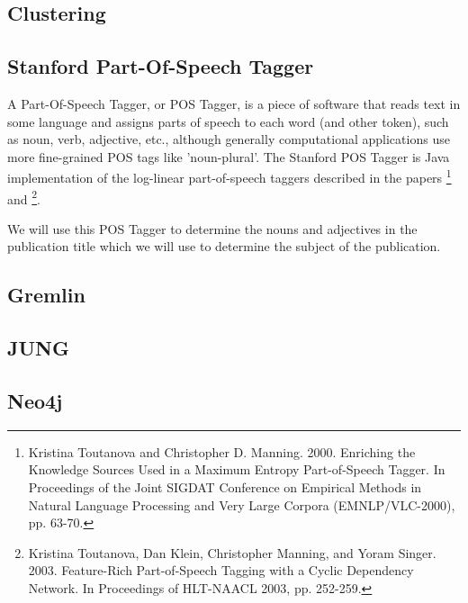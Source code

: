 \subsection{Clustering}

\subsection{Stanford Part-Of-Speech Tagger}


A Part-Of-Speech Tagger, or POS Tagger, is a piece of software that reads text in some language and assigns parts of speech to each word (and other token), such as noun, verb, adjective, etc., although generally computational applications use more fine-grained POS tags like 'noun-plural'. The Stanford POS Tagger is Java implementation of the log-linear part-of-speech taggers described in the papers \footnote{Kristina Toutanova and Christopher D. Manning. 2000. Enriching the Knowledge Sources Used in a Maximum Entropy Part-of-Speech Tagger. In Proceedings of the Joint SIGDAT Conference on Empirical Methods in Natural Language Processing and Very Large Corpora (EMNLP/VLC-2000), pp. 63-70.} and \footnote{Kristina Toutanova, Dan Klein, Christopher Manning, and Yoram Singer. 2003. Feature-Rich Part-of-Speech Tagging with a Cyclic Dependency Network. In Proceedings of HLT-NAACL 2003, pp. 252-259.}.

We will use this POS Tagger to determine the nouns and adjectives in the publication title which we will use to determine the subject of the publication.

\subsection{Gremlin}

\subsection{JUNG}

\subsection{Neo4j}